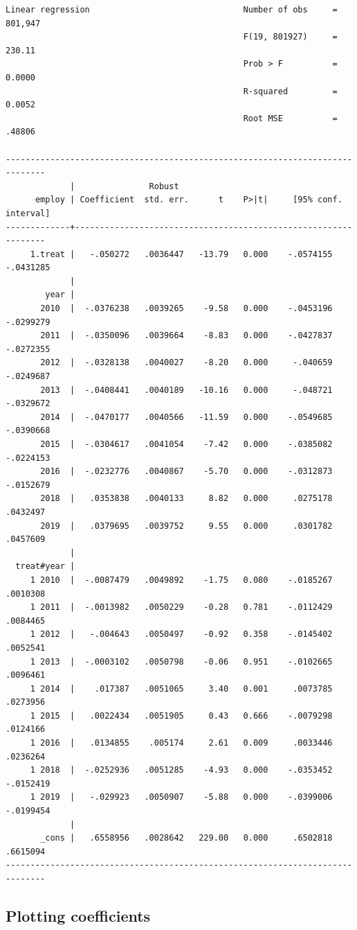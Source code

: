 \documentclass[
  letterpaper,
  DIV=11,
  numbers=noendperiod]{scrartcl}
\begin{document}
\begin{verbatim}
Linear regression                               Number of obs     =    801,947
                                                F(19, 801927)     =     230.11
                                                Prob > F          =     0.0000
                                                R-squared         =     0.0052
                                                Root MSE          =     .48806

------------------------------------------------------------------------------
             |               Robust
      employ | Coefficient  std. err.      t    P>|t|     [95% conf. interval]
-------------+----------------------------------------------------------------
     1.treat |   -.050272   .0036447   -13.79   0.000    -.0574155   -.0431285
             |
        year |
       2010  |  -.0376238   .0039265    -9.58   0.000    -.0453196   -.0299279
       2011  |  -.0350096   .0039664    -8.83   0.000    -.0427837   -.0272355
       2012  |  -.0328138   .0040027    -8.20   0.000     -.040659   -.0249687
       2013  |  -.0408441   .0040189   -10.16   0.000     -.048721   -.0329672
       2014  |  -.0470177   .0040566   -11.59   0.000    -.0549685   -.0390668
       2015  |  -.0304617   .0041054    -7.42   0.000    -.0385082   -.0224153
       2016  |  -.0232776   .0040867    -5.70   0.000    -.0312873   -.0152679
       2018  |   .0353838   .0040133     8.82   0.000     .0275178    .0432497
       2019  |   .0379695   .0039752     9.55   0.000     .0301782    .0457609
             |
  treat#year |
     1 2010  |  -.0087479   .0049892    -1.75   0.080    -.0185267    .0010308
     1 2011  |  -.0013982   .0050229    -0.28   0.781    -.0112429    .0084465
     1 2012  |   -.004643   .0050497    -0.92   0.358    -.0145402    .0052541
     1 2013  |  -.0003102   .0050798    -0.06   0.951    -.0102665    .0096461
     1 2014  |    .017387   .0051065     3.40   0.001     .0073785    .0273956
     1 2015  |   .0022434   .0051905     0.43   0.666    -.0079298    .0124166
     1 2016  |   .0134855    .005174     2.61   0.009     .0033446    .0236264
     1 2018  |  -.0252936   .0051285    -4.93   0.000    -.0353452   -.0152419
     1 2019  |   -.029923   .0050907    -5.88   0.000    -.0399006   -.0199454
             |
       _cons |   .6558956   .0028642   229.00   0.000     .6502818    .6615094
------------------------------------------------------------------------------
\end{verbatim}

\subsection{Plotting coefficients}\label{plotting-coefficients}
\end{document}
